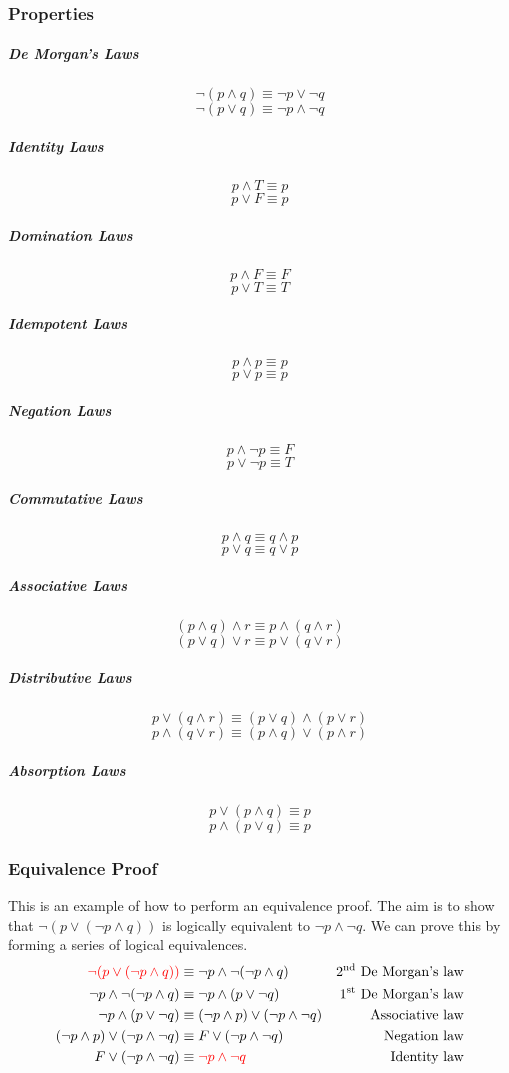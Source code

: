 \documentclass[a4paper, 10pt]{article}
\begin{document}
\subsubsection{Properties}
\begin{multicols}{2}
    \subparagraph{De Morgan's Laws}
    \[ \neg(p\land q) \equiv \neg p \lor \neg q \]
    \[ \neg(p\lor q) \equiv \neg p \land \neg q \]

    \subparagraph{Identity Laws}
    \[ p \land T \equiv p \]
    \[ p \lor F \equiv p \]

    \subparagraph{Domination Laws}
    \[ p \land F \equiv F \]
    \[ p \lor T \equiv T \]

    \subparagraph{Idempotent Laws}
    \[p \land p \equiv p\]
    \[ p \lor p \equiv p\]

    \subparagraph{Negation Laws}
    \[ p \land \neg p \equiv F \]
    \[ p \lor \neg p \equiv T \]

    \subparagraph{Commutative Laws}
    \[ p \land q \equiv q \land p\]
    \[ p \lor q \equiv q \lor p \]

    \subparagraph{Associative Laws}
    \[ (p \land q)\land r \equiv p\land(q\land r) \]
    \[ (p \lor q)\lor r \equiv p\lor(q\lor r) \]

    \subparagraph{Distributive Laws}
    \[ p\lor (q \land r) \equiv (p\lor q) \land (p\lor r) \]
    \[ p\land (q\lor r) \equiv (p\land q)\lor(p\land r) \]

    \subparagraph{Absorption Laws}
    \[ p \lor (p\land q) \equiv p \]
    \[ p \land (p\lor q) \equiv p \]
\end{multicols}

\subsubsection{Equivalence Proof}
This is an example of how to perform an equivalence proof. The aim is to show that \( \neg(p\lor (\neg p \land q)) \) is logically equivalent to \( \neg p\land \neg q \). We can prove this by forming a series of logical equivalences.
\begin{align*}
    \textcolor{red}{\neg (p\lor(\neg p\land q))} &\equiv \neg p \land \neg(\neg p\land q) & \text{2\textsuperscript{nd} De Morgan's law}\\
    \neg p \land \neg(\neg p\land q) &\equiv \neg p \land (p\lor\neg q) & \text{1\textsuperscript{st} De Morgan's law} \\
    \neg p \land (p\lor\neg q) &\equiv (\neg p \land p)\lor(\neg p\land \neg q) & \text{Associative law} \\
    (\neg p \land p)\lor(\neg p\land \neg q) &\equiv F \lor (\neg p \land \neg q) & \text{Negation law} \\
    F \lor (\neg p \land \neg q) &\equiv \textcolor{red}{\neg p \land \neg q} & \text{Identity law}
\end{align*}
\end{document}
